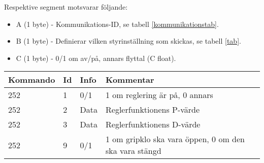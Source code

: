 \documentclass[11pt]{article}
\begin{document}
\begin{flushleft}
Respektive segment motsvarar följande: 
\begin{itemize}
	\item A (1 byte) - Kommunikations-ID, se tabell \ref{kommunikationstab}.
	\item B (1 byte) - Definierar vilken styrinställning som skickas, se tabell \ref{tab}.
	\item C (1 byte) - 0/1 om av/på, annars flyttal (C float).
\end{itemize}




\pagebreak

\begin{table}[h]
\begin{tabular}{|p{6em}|p{1em}|p{6em}|p{25em}|} \hline

\textbf{Kommando} & \textbf{Id} & \textbf{Info} & \textbf{Kommentar}\\ \hline

252 & 1 & 0/1 & 1 om reglering är på, 0 annars \\ \hline
252 & 2 & Data & Reglerfunktionens P-värde \\ \hline
252 & 3 & Data & Reglerfunktionens D-värde \\ \hline
252 & 9 & 0/1 & 1 om gripklo ska vara öppen, 0 om den ska vara stängd \\ \hline


\end{tabular}
\end{table}
\end{flushleft}
\end{document}
